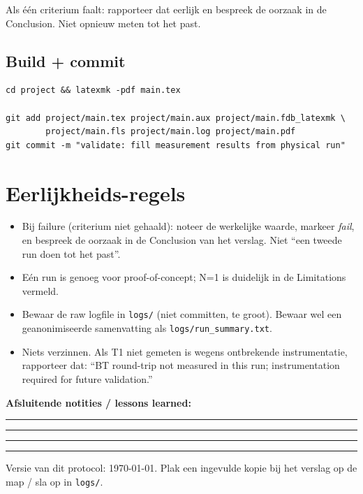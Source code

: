 \documentclass[11pt, a4paper]{article}
\newcommand{\fillblock}[1]{\rule[-0.5ex]{#1}{0.4pt}}
\begin{document}
Als één criterium faalt: rapporteer dat eerlijk en bespreek de oorzaak
in de Conclusion. Niet opnieuw meten tot het past.

\subsection{Build + commit}

\begin{lstlisting}
cd project && latexmk -pdf main.tex

git add project/main.tex project/main.aux project/main.fdb_latexmk \
        project/main.fls project/main.log project/main.pdf
git commit -m "validate: fill measurement results from physical run"
\end{lstlisting}

\section{Eerlijkheids-regels}

\begin{itemize}[leftmargin=2em, label=$\square$]
  \item Bij failure (criterium niet gehaald): noteer de werkelijke waarde,
        markeer \emph{fail}, en bespreek de oorzaak in de Conclusion van
        het verslag. Niet ``een tweede run doen tot het past''.
  \item Eén run is genoeg voor proof-of-concept; N=1 is duidelijk in de
        Limitations vermeld.
  \item Bewaar de raw logfile in \texttt{logs/} (niet committen, te groot).
        Bewaar wel een geanonimiseerde samenvatting als \texttt{logs/run\_summary.txt}.
  \item Niets verzinnen. Als T1 niet gemeten is wegens ontbrekende
        instrumentatie, rapporteer dat: ``BT round-trip not measured
        in this run; instrumentation required for future validation.''
\end{itemize}

\vspace{1.5em}

\begin{fillbox}
\textbf{Afsluitende notities / lessons learned:}

\fillblock{\textwidth}

\fillblock{\textwidth}

\fillblock{\textwidth}

\fillblock{\textwidth}
\end{fillbox}

\vspace{0.5em}
\footnotesize Versie van dit protocol: \today. Plak een ingevulde kopie
bij het verslag op de map / sla op in \texttt{logs/}.
\end{document}
